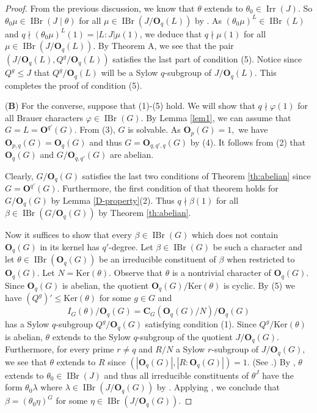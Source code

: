 \documentclass[12pt]{amsart}
\theoremstyle{remark}
\numberwithin{equation}{section}
\begin{document}
\begin{proof}
\medskip
From the previous discussion, we know that $\theta$ extends to $\theta_0\in\operatorname{Irr}(J).$ So $\theta_0\mu\in\operatorname{IBr}(J \mid \theta)$ for all $\mu\in\operatorname{IBr}(J/{\mathbf{O}}_q(L))$ by \cite[Corollary 8.20]{Navarro}. As $(\theta_0\mu)^L\in\operatorname{IBr}(L)$ and $q\nmid (\theta_0\mu)^L(1)=|L:J|\mu(1)$, we deduce that $q\nmid \mu(1)$ for all $\mu \in \operatorname{IBr}(J/{\mathbf{O}}_q(L)).$ By Theorem A, we see that the pair $(J/{\mathbf{O}}_q(L),Q^g/{\mathbf{O}}_q(L))$ satisfies the last part of condition (5).  Notice since $Q^g\le J$ that $Q^g/{\mathbf{O}}_q (L)$ will be a Sylow $q$-subgroup of $J/{\mathbf{O}}_q (L)$.  This completes the proof of condition (5).

\medskip
(\textbf{B})
For the converse, suppose that (1)-(5) hold. We will show that $q\nmid\varphi(1)$ for all Brauer characters $\varphi \in \operatorname{IBr}(G).$ By Lemma \ref{lem1}, we can assume that $G=L={\mathbf{O}}^{q'}(G).$ From (3), $G$ is solvable. As ${\mathbf{O}}_p(G)=1,$ we have ${\mathbf{O}}_{p,q}(G)={\mathbf{O}}_q(G)$ and thus $G={\mathbf{O}}_{q,q',q}(G)$  by (4). It follows from (2) that ${\mathbf{O}}_q(G)$ and $G/{\mathbf{O}}_{q,q'}(G)$ are abelian.

Clearly, $G/{\mathbf{O}}_q(G)$ satisfies the last two conditions of Theorem \ref{th:abelian} since $G={\mathbf{O}}^{q'}(G).$ Furthermore, the first condition of that theorem holds for $G/{\mathbf{O}}_q(G)$  by Lemma \ref{D-property}(2). Thus $q\nmid \beta(1)$ for all $\beta\in\operatorname{IBr}(G/{\mathbf{O}}_q(G))$ by Theorem \ref{th:abelian}.

Now it suffices to show that every $\beta\in\operatorname{IBr}(G)$ which does not contain ${\mathbf{O}}_q(G)$ in its kernel has $q'$-degree. Let $\beta\in\operatorname{IBr}(G)$ be such a character and let $\theta\in\operatorname{IBr}({\mathbf{O}}_q(G))$ be an irreducible constituent of $\beta$ when restricted to ${{\mathbf{O}}_q (G)}$. Let  $N={{\mathrm {Ker}}}(\theta).$ Observe that $\theta$ is a nontrivial character of ${\mathbf{O}}_q(G).$ Since ${\mathbf{O}}_q(G)$ is abelian, the quotient  ${\mathbf{O}}_q(G)/{{\mathrm {Ker}}}(\theta)$ is cyclic.  By (5) we have $(Q^g)'\leq {{\mathrm {Ker}}}(\theta)$ for some $g\in G$ and $$I_G(\theta)/{\mathbf{O}}_q(G)={\mathbf{C}}_G({\mathbf{O}}_q(G)/N)/{\mathbf{O}}_q(G)$$ has a Sylow $q$-subgroup $Q^g/{\mathbf{O}}_q(G)$ satisfying condition (1).  Since $Q^g/{{\mathrm {Ker}}}(\theta)$ is abelian, $\theta$ extends to the Sylow $q$-subgroup of the quotient $J/{\mathbf{O}}_q(G).$  Furthermore, for every prime $r\neq q$ and $R/N$ a Sylow $r$-subgroup of $J/{\mathbf{O}}_q(G),$ we see that $\theta$ extends to $R$ since $(|{\mathbf{O}}_q(G)|,|R:{\mathbf{O}}_q(G)|)=1.$ (See \cite[Theorem 8.23]{Navarro}.)  By \cite[Theorem 8.29]{Navarro}, $\theta$ extends to $\theta_0\in\operatorname{IBr}(J)$ and thus all irreducible constituents of $\theta^J$ have the form $\theta_0\lambda$ where $\lambda\in\operatorname{IBr}(J/{\mathbf{O}}_q(G))$ by \cite[Corollary 8.20]{Navarro}. Applying \cite[Theorem 8.9]{Navarro}, we conclude that $\beta = (\theta_0\eta)^G$ for some $\eta \in \operatorname{IBr}(J/{\mathbf{O}}_q(G))$.


\end{proof}
\end{document}
